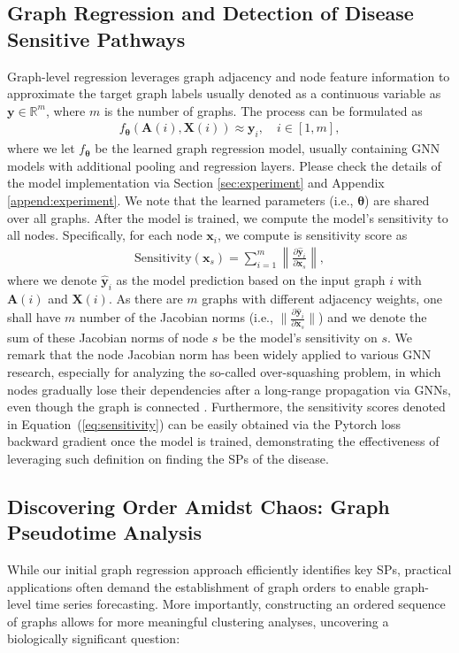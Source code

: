 \documentclass{article} %
\begin{document}
\subsection{Graph Regression and Detection of Disease Sensitive Pathways}\label{sec:key_factor_1}
Graph-level regression leverages graph adjacency and node feature information to approximate the target graph labels usually denoted as a continuous variable as $\mathbf y \in \mathbb R^m$, where $m$ is the number of graphs. The process can be formulated as 
\begin{align}
    f_{\boldsymbol{\theta}} (\mathbf A (i), \mathbf X(i)) \approx \mathbf y_i, \quad i \in [1,m],
\end{align}
where we let $f_{\boldsymbol{\theta}}$ be the learned graph regression model, usually containing GNN models with additional pooling and regression layers. Please check the details of the model implementation via Section \ref{sec:experiment} and Appendix \ref{append:experiment}. We note that the learned parameters (i.e., $\boldsymbol{\theta}$) are shared over all graphs. After the model is trained, we compute the model's sensitivity to all nodes. Specifically, for each node $\mathbf x_i$, we compute is sensitivity score as
\begin{align}\label{eq:sensitivity}
    \mathrm{Sensitivity}(\mathbf x_s) = \sum_{i=1}^m\left\|\frac{\partial \widehat {\mathbf y}_i}{\partial \mathbf x_s}\right \|,
\end{align}
where we denote $\widehat {\mathbf y}_i$ as the model prediction based on the input graph $i$ with $\mathbf A(i)$ and $\mathbf X(i)$. As there are $m$ graphs with different adjacency weights, one shall have $m$ number of the Jacobian norms (i.e., $\|\frac{\partial \widehat {\mathbf y}_i}{\partial \mathbf x_s}\|$) and we denote the sum of these Jacobian norms of node $s$ be the model's sensitivity on $s$. We remark that the node Jacobian norm has been widely applied to various GNN research, especially for analyzing the so-called over-squashing problem, in which nodes gradually lose their dependencies after a long-range propagation via GNNs, even though the graph is connected \citep{shi2023exposition}. Furthermore, the sensitivity scores denoted in Equation~(\ref{eq:sensitivity}) can be easily obtained via the Pytorch loss backward gradient once the model is trained, demonstrating the effectiveness of leveraging such definition on finding the SPs 
of the disease. 

\subsection{Discovering Order Amidst Chaos: Graph Pseudotime Analysis}
While our initial graph regression approach efficiently identifies key SPs, practical applications often demand the establishment of graph orders to enable graph-level time series forecasting. More importantly, constructing an ordered sequence of graphs allows for more meaningful clustering analyses, uncovering a biologically significant question: 
\end{document}
